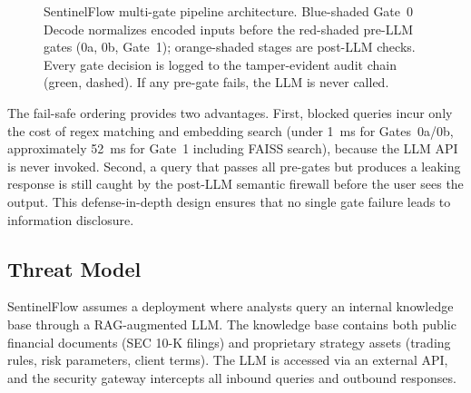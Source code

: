 \documentclass[journal]{IEEEtran}
\begin{document}
\begin{figure}[!ht]
\caption{SentinelFlow multi-gate pipeline architecture. Blue-shaded Gate~0 Decode normalizes encoded inputs before the red-shaded pre-LLM gates (0a, 0b, Gate~1); orange-shaded stages are post-LLM checks. Every gate decision is logged to the tamper-evident audit chain (green, dashed). If any pre-gate fails, the LLM is never called.}
\label{fig:architecture}
\end{figure}

The fail-safe ordering provides two advantages. First, blocked queries incur only the cost of regex matching and embedding search (under 1~ms for Gates~0a/0b, approximately 52~ms for Gate~1 including FAISS search), because the LLM API is never invoked. Second, a query that passes all pre-gates but produces a leaking response is still caught by the post-LLM semantic firewall before the user sees the output. This defense-in-depth design ensures that no single gate failure leads to information disclosure.

\subsection{Threat Model}
\label{Sect:Threat_Model}

SentinelFlow assumes a deployment where analysts query an internal knowledge base through a RAG-augmented LLM. The knowledge base contains both public financial documents (SEC 10-K filings) and proprietary strategy assets (trading rules, risk parameters, client terms). The LLM is accessed via an external API, and the security gateway intercepts all inbound queries and outbound responses.
\end{document}
